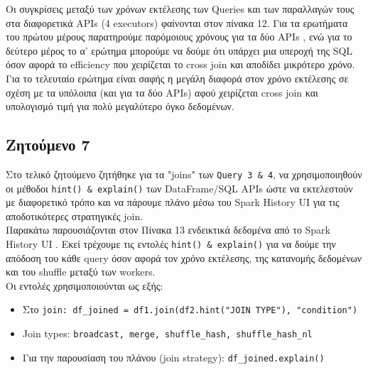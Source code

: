 \documentclass{article}
\begin{document}
Οι συγκρίσεις μεταξύ των χρόνων εκτέλεσης των Queries  και των παραλλαγών τους στα διαφορετικά APIs (4 executors) φαίνονται στον πίνακα 12. Για τα ερωτήματα του πρώτου μέρους παρατηρούμε παρόμοιους χρόνους για τα δύο  APIs , ενώ για το δεύτερο μέρος το α' ερώτημα μπορούμε να δούμε ότι υπάρχει μια υπεροχή της  SQL όσον αφορά το  efficiency που χειρίζεται το  cross join  και αποδίδει μικρότερο χρόνο. Για το τελευταίο ερώτημα είναι σαφής η μεγάλη διαφορά στον χρόνο εκτέλεσης σε σχέση με τα υπόλοιπα (και για τα δύο  APIs)  αφού χειρίζεται  cross join και υπολογισμό τιμή για πολύ μεγαλύτερο όγκο δεδομένων. 


\subsection{Ζητούμενο 7}
\label{subsec:Z7}


Στο τελικό ζητούμενο ζητήθηκε για τα  "joins"  των  \texttt{Query 3 \& 4},
 να χρησιμοποιηθούν οι μέθοδοι \texttt{hint() \& explain()}  των  DataFrame/SQL APIs ώστε να εκτελεστούν με διαφορετικό τρόπο και να πάρουμε πλάνο μέσω του  Spark History UI  για τις αποδοτικότερες στρατηγικές  join.\\ 






Παρακάτω παρουσιάζονται στον Πίνακα 13 ενδεικτικά δεδομένα από το  Spark History UI . Εκεί τρέχουμε τις εντολές \texttt{hint() \& explain()}  για να δούμε την απόδοση του κάθε  query  όσον αφορά τον χρόνο εκτέλεσης, της κατανομής δεδομένων και του  shuffle  μεταξύ των  workers.\\
Οι εντολές χρησιμοποιούνται ως εξής: 
\begin{itemize}
    \item   Στο  \texttt{join: df\_joined = df1.join(df2.hint("JOIN TYPE"), "condition")}
    \item   Join types: \texttt{broadcast, merge, shuffle\_hash, shuffle\_hash\_nl}
    
    \item   {}Για την παρουσίαση του πλάνου (join strategy): \texttt{df\_joined.explain()}
\end{itemize}
\end{document}
